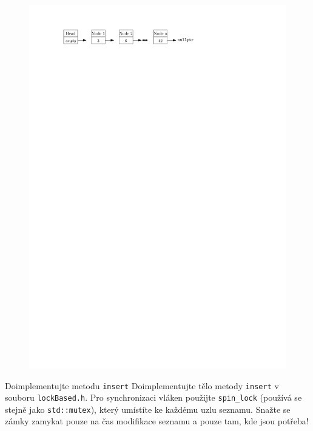 \documentclass[usenames,dvipsnames,9pt]{beamer}
\begin{document}
{\begin{frame}[fragile]
  \begin{figure}
    \centering\includegraphics{figs/linkedList.pdf}
  \end{figure}
  
    \pause

  \vspace{2em}
  
  \begin{block}{Doimplementujte metodu \texttt{insert}}
    Doimplementujte tělo metody \texttt{insert} v souboru \texttt{lockBased.h}.
    Pro synchronizaci vláken použijte \texttt{spin\_lock} (používá se stejně jako \texttt{std::mutex}), který umístíte ke každému uzlu seznamu.
    Snažte se zámky zamykat pouze na čas modifikace seznamu a pouze tam, kde jsou potřeba!
  \end{block}
\end{frame}
}
\end{document}
